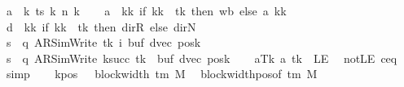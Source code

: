 \begin{isabellebody}
\ {\isacharquery}{\kern0pt}a\ {\isacharequal}{\kern0pt}\ {\isachardoublequoteopen}{\isasymlambda}k{\isachardot}{\kern0pt}\ ts\ k\ {\isacharparenleft}{\kern0pt}n\ k{\isacharparenright}{\kern0pt}{\isachardoublequoteclose}\isanewline
\ \ \isamarkupfalse%
\ {\isacharquery}{\kern0pt}a{\isacharprime}{\kern0pt}\ {\isacharequal}{\kern0pt}\ {\isachardoublequoteopen}{\isasymlambda}kk{\isachardot}{\kern0pt}\ if\ kk\ {\isacharequal}{\kern0pt}\ tk\ then\ {\isacharquery}{\kern0pt}wb\ else\ {\isacharquery}{\kern0pt}a\ kk{\isachardoublequoteclose}\isanewline
\ \ \isamarkupfalse%
\ {\isacharquery}{\kern0pt}d\ {\isacharequal}{\kern0pt}\ {\isachardoublequoteopen}{\isasymlambda}kk{\isachardot}{\kern0pt}\ if\ kk\ {\isacharequal}{\kern0pt}\ tk\ then\ dir{\isachardot}{\kern0pt}R\ else\ dir{\isachardot}{\kern0pt}N{\isachardoublequoteclose}\isanewline
\ \ \isamarkupfalse%
\ {\isacharquery}{\kern0pt}s\ {\isacharequal}{\kern0pt}\ {\isachardoublequoteopen}{\isacharparenleft}{\kern0pt}q{\isacharcomma}{\kern0pt}\ AR{\isacharunderscore}{\kern0pt}SimWrite{\isacharcomma}{\kern0pt}\ tk{\isacharcomma}{\kern0pt}\ i{\isacharcomma}{\kern0pt}\ buf{\isacharcomma}{\kern0pt}\ dvec{\isacharcomma}{\kern0pt}\ posk{\isacharparenright}{\kern0pt}{\isachardoublequoteclose}\isanewline
\ \ \isamarkupfalse%
\ {\isacharquery}{\kern0pt}s{\isacharprime}{\kern0pt}\ {\isacharequal}{\kern0pt}\ {\isachardoublequoteopen}{\isacharparenleft}{\kern0pt}q{\isacharcomma}{\kern0pt}\ AR{\isacharunderscore}{\kern0pt}SimWrite{\isacharcomma}{\kern0pt}\ k{\isacharunderscore}{\kern0pt}succ\ tk{\isacharcomma}{\kern0pt}\ {}{\isacharcomma}{\kern0pt}\ buf{\isacharcomma}{\kern0pt}\ dvec{\isacharcomma}{\kern0pt}\ posk{\isacharparenright}{\kern0pt}{\isachardoublequoteclose}\isanewline
\ \ \isamarkupfalse%
\ aTk{\isacharcolon}{\kern0pt}\ {\isachardoublequoteopen}{\isacharquery}{\kern0pt}a\ tk\ {\isasymnoteq}\ LE{}{\isachardoublequoteclose}\ \isamarkupfalse%
\ notLE\ c{\isacharprime}{\kern0pt}{\isacharunderscore}{\kern0pt}eq\ \isamarkupfalse%
\ simp\isanewline
\ \ \isamarkupfalse%
\ kpos{\isacharcolon}{\kern0pt}\ {\isachardoublequoteopen}{}\ {\isacharless}{\kern0pt}\ block{\isacharunderscore}{\kern0pt}width\ {\isacharparenleft}{\kern0pt}{\isasymGamma}{\isacharunderscore}{\kern0pt}tm\ M{\isacharparenright}{\kern0pt}{\isachardoublequoteclose}\ \isamarkupfalse%
\ block{\isacharunderscore}{\kern0pt}width{\isacharunderscore}{\kern0pt}pos{\isacharbrackleft}{\kern0pt}of\ {\isachardoublequoteopen}{\isasymGamma}{\isacharunderscore}{\kern0pt}tm\ M{\isachardoublequoteclose}{\isacharbrackright}{\kern0pt}\ \isamarkupfalse%

\end{isabellebody}
